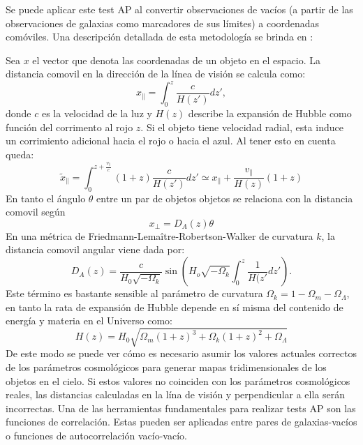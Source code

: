 \documentclass[preprint]{aastex62}
\begin{document}
  Se puede aplicar este test AP al convertir observaciones de
  vacíos (a partir de las observaciones de galaxias como marcadores de sus límites) a coordenadas
  comóviles. Una descripción detallada de esta metodología se brinda en \citet{Hamaus2015}:

  Sea $x$ el vector que denota las coordenadas de un objeto en el espacio. La distancia comovil en la
  dirección de la línea de visión se calcula como:
  \begin{equation}
    x_{\parallel} = \int _0 ^z \frac{c}{H(z')}dz',
  \end{equation}
  donde $c$ es la velocidad de la luz y $H(z)$ describe la expansión de Hubble como función del
  corrimento al rojo $z$. Si el objeto tiene velocidad radial, esta induce un corrimiento adicional
  hacia el rojo o hacia el azul. Al tener esto en cuenta queda:
  \begin{equation}
    \tilde{x}_{\parallel} = \int _0 ^{z + \frac{v_\parallel}{c}}(1+z) \frac{c}{H(z')}dz'
    \simeq x_\parallel + \frac{v_\parallel}{H(z)}(1+z)
  \end{equation}
  En tanto el ángulo $\theta$  entre un par de objetos objetos se relaciona con la distancia comovil según
  \begin{equation}
    x_{\perp} = D_A(z)\theta
  \end{equation} 
  En una métrica de  Friedmann-Lema\^itre-Robertson-Walker de curvatura $k$, la distancia
  comovil angular viene dada por:
  \begin{equation}
    D_A(z) = \frac{c}{H_0\sqrt{-\Omega_k}} \sin \left( H_o\sqrt{-\Omega_k}
    \int_0^z \frac{1}{H(z'} dz' \right).
  \end{equation}
  Este término es bastante sensible al parámetro de curvatura
  $\Omega_k = 1 - \Omega_m - \Omega_\Lambda$, en tanto la rata de expansión de Hubble
  depende en sí misma del contenido de energía y materia en el Universo como:
  \begin{equation}
    H(z) = H_0 \sqrt{ \Omega_m(1+z)^3 + \Omega_k(1+z)^2+\Omega_\Lambda}
  \end{equation}
  De este modo se puede ver cómo es necesario asumir los valores actuales correctos de los
  parámetros cosmológicos para generar mapas tridimensionales de los objetos en el cielo. Si
  estos valores no coinciden con los parámetros
  cosmológicos reales, las distancias calculadas en la lína de visión y perpendicular a ella serán
  incorrectas. Una de las herramientas fundamentales para realizar tests AP son las funciones
  de correlación. Estas pueden ser aplicadas entre pares de galaxias-vacíos o funciones de
  autocorrelación vacío-vacío.
  
\end{document}
